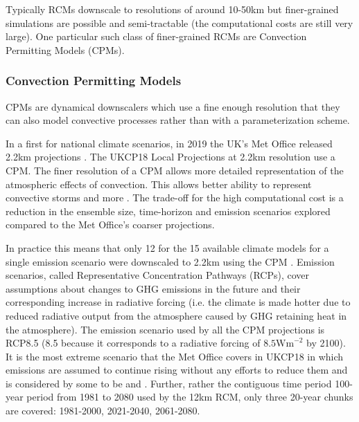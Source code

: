 Typically RCMs downscale to resolutions of around 10-50km but finer-grained simulations are possible and semi-tractable (the computational costs are still very large). One particular such class of finer-grained RCMs are Convection Permitting Models (CPMs).

\subsubsection{Convection Permitting Models} \label{sec:downscalingbg:cpm}

CPMs are dynamical downscalers which use a fine enough resolution that they can also model convective processes rather than  \cite{kendon2019ukcpscience} with a parameterization scheme.

In a first for national climate scenarios, in 2019 the UK's Met Office released 2.2km projections \cite{kendon2019ukcpscience}. The UKCP18 Local Projections at 2.2km resolution use a CPM. The finer resolution of a CPM allows more detailed representation of the atmospheric effects of convection. This allows better ability to represent convective storms and more  \cite{kendon2019ukcpscience}. The trade-off for the high computational cost is a reduction in the ensemble size, time-horizon and emission scenarios explored compared to the Met Office's coarser projections.

In practice this means that only 12 for the 15 available climate models for a single emission scenario were downscaled to 2.2km using the CPM \cite{kendon2019ukcpscience}. Emission scenarios, called Representative Concentration Pathways (RCPs), cover assumptions about changes to GHG emissions in the future and their corresponding increase in radiative forcing (i.e. the climate is made hotter due to reduced radiative output from the atmosphere caused by GHG retaining heat in the atmosphere). The emission scenario used by all the CPM projections is RCP8.5 (8.5 because it corresponds to a radiative forcing of \(8.5\textrm{Wm}^{-2}\) by 2100). It is the most extreme scenario that the Met Office covers in UKCP18 in which emissions are assumed to continue rising without any efforts to reduce them \cite{metoffice2018rcpguidance} and is considered by some to be  and  \cite{hausfather2020rcp85misleading}. Further, rather the contiguous time period 100-year period from 1981 to 2080 used by the 12km RCM, only three 20-year chunks are covered: 1981-2000, 2021-2040, 2061-2080.

